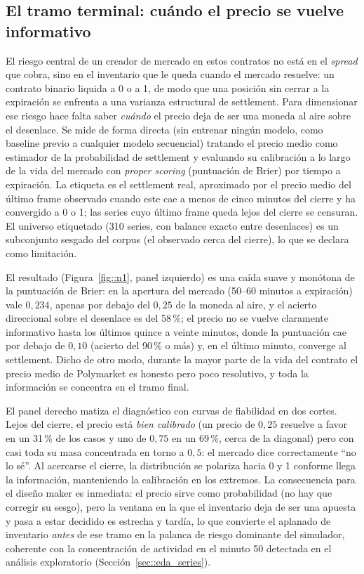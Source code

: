 \subsection{El tramo terminal: cuándo el precio se vuelve informativo}
\label{sec::tramo_terminal}

El riesgo central de un creador de mercado en estos contratos no está en el
\emph{spread} que cobra, sino en el inventario que le queda cuando el mercado resuelve:
un contrato binario liquida a 0 o a 1, de modo que una posición sin cerrar a la
expiración se enfrenta a una varianza estructural de settlement. Para dimensionar ese
riesgo hace falta saber \emph{cuándo} el precio deja de ser una moneda al aire sobre el
desenlace. Se mide de forma directa (sin entrenar ningún modelo, como baseline previo a
cualquier modelo secuencial) tratando el precio medio como estimador de la probabilidad
de settlement y evaluando su calibración a lo largo de la vida del mercado con
\emph{proper scoring} (puntuación de Brier) por tiempo a expiración. La etiqueta es el
settlement real, aproximado por el precio medio del último frame observado cuando este
cae a menos de cinco minutos del cierre y ha convergido a 0 o 1; las series cuyo último
frame queda lejos del cierre se censuran. El universo etiquetado (310 series, con
balance exacto entre desenlaces) es un subconjunto sesgado del corpus (el observado
cerca del cierre), lo que se declara como limitación.

El resultado (Figura~\ref{fig::n1}, panel izquierdo) es una caída suave y monótona de la
puntuación de Brier: en la apertura del mercado (50--60 minutos a expiración) vale
$0{,}234$, apenas por debajo del $0{,}25$ de la moneda al aire, y el acierto direccional
sobre el desenlace es del 58\,\%; el precio no se vuelve claramente informativo hasta los
últimos quince a veinte minutos, donde la puntuación cae por debajo de $0{,}10$ (acierto
del 90\,\% o más) y, en el último minuto, converge al settlement. Dicho de otro modo, durante
la mayor parte de la vida del contrato el precio medio de Polymarket es honesto pero poco
resolutivo, y toda la información se concentra en el tramo final.

El panel derecho matiza el diagnóstico con curvas de fiabilidad en dos cortes. Lejos del
cierre, el precio está \emph{bien calibrado} (un precio de $0{,}25$ resuelve a favor en
un 31\,\% de los casos y uno de $0{,}75$ en un 69\,\%, cerca de la diagonal) pero con casi
toda su masa concentrada en torno a $0{,}5$: el mercado dice correctamente ``no lo sé''. Al
acercarse el cierre, la distribución se polariza hacia 0 y 1 conforme llega la
información, manteniendo la calibración en los extremos. La consecuencia para el diseño
maker es inmediata: el precio sirve como probabilidad (no hay que corregir su sesgo), pero
la ventana en la que el inventario deja de ser una apuesta y pasa a estar decidido es
estrecha y tardía, lo que convierte el aplanado de inventario \emph{antes} de ese tramo en
la palanca de riesgo dominante del simulador, coherente con la concentración de actividad
en el minuto 50 detectada en el análisis exploratorio (Sección~\ref{sec::eda_series}).

